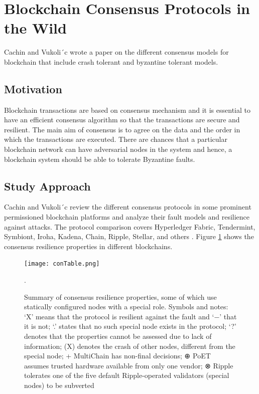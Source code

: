\documentclass[
  a4paper,  %
  twoside,  %
  bibliography=totoc,
  headsepline,
  cleardoublepage=empty,
  parskip=half,
  draft=false
]{scrbook}
\begin{document}
\section{Blockchain Consensus Protocols in the Wild}
Cachin and Vukoli´c \cite{Con} wrote a paper on the different consensus models for blockchain that include crash tolerant and byzantine tolerant models.

\subsection{Motivation}
Blockchain transactions are based on consensus mechanism and it is essential to have an efficient consensus algorithm so that the transactions are secure and resilient. The main aim of consensus is to agree on the data and the order in which the transactions are executed. There are chances that a particular blockchain network can have adversarial nodes in the system and hence, a blockchain system should be able to tolerate Byzantine faults. 

\subsection{Study Approach}
Cachin and Vukoli´c review the different consensus protocols in some prominent permissioned blockchain platforms and analyze their fault models and resilience against attacks. The protocol comparison covers Hyperledger Fabric, Tendermint, Symbiont, Iroha, Kadena, Chain,  Ripple, Stellar, and others \cite{Con}. Figure \ref{fig:conT} shows the consensus resilience properties in different blockchains.

\begin{figure}[h!]
\begin{center}
\texttt{[image: conTable.png]}
\caption{Summary of consensus resilience properties, some of which use statically configured nodes
with a special role. Symbols and notes: ‘X’ means that the protocol is resilient against the fault and ‘−’
that it is not; ‘.’ states that no such special node exists in the protocol; ‘?’ denotes that the properties
cannot be assessed due to lack of information; (X) denotes the crash of other nodes, different from the
special node; + MultiChain has non-final decisions; ⊕ PoET assumes trusted hardware available from
only one vendor; ⊗ Ripple tolerates one of the five default Ripple-operated validators (special nodes) to
be subverted \cite{Con}}.
\label{fig:conT}
\end{center}
\end{figure}
\end{document}
